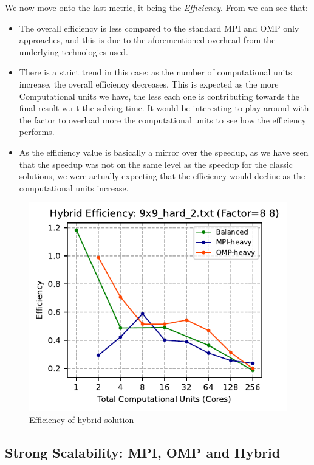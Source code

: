 We now move onto the last metric, it being the \textit{Efficiency}. From  we can see that:
\begin{itemize}
    \item The overall efficiency is less compared to the standard MPI and OMP only approaches, and this is due to the aforementioned overhead from the underlying technologies used.
    \item There is a strict trend in this case: as the number of computational units increase, the overall efficiency decreases. This is expected as the more Computational units we have, the less each one is contributing towards the final result w.r.t the solving time. It would be interesting to play around with the factor to overload more the computational units to see how the efficiency performs.
    \item As the efficiency value is basically a mirror over the speedup, as we have seen that the speedup was not on the same level as the speedup for the classic solutions, we were actually expecting that the efficiency would decline as the computational units increase.
\end{itemize}


\begin{figure}[htbp]
\centering
\includegraphics[width=0.9\linewidth]{imgs/efficiency_hybrid_9x9_hard_2.pdf}
\caption{Efficiency of hybrid solution}
\label{fig:efficiency_hybrid}
\end{figure}

\subsection{Strong Scalability: MPI, OMP and Hybrid}
\label{subsec:scalability}

